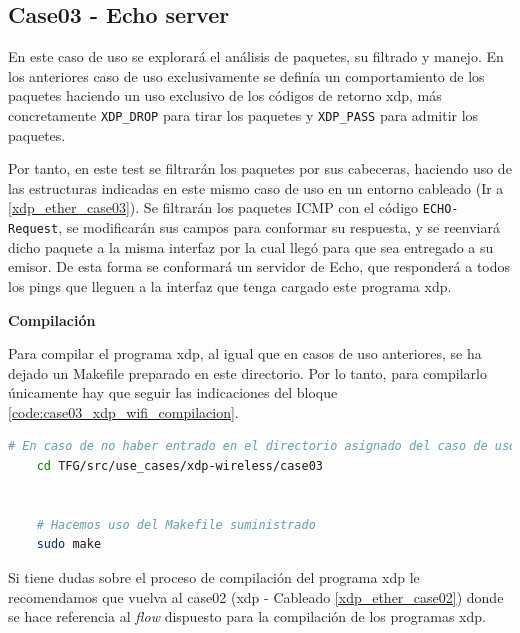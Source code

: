 \subsection{Case03 - Echo server}
\label{xdp_wifi_case03}

En este caso de uso se explorará el análisis de paquetes, su filtrado y manejo. En los anteriores caso de uso exclusivamente se definía un comportamiento de los paquetes haciendo un uso exclusivo de los códigos de retorno \gls{xdp}, más concretamente \texttt{XDP\_DROP} para tirar los paquetes y \texttt{XDP\_PASS} para admitir los paquetes.\\
\par
Por tanto, en este test se filtrarán los paquetes por sus cabeceras, haciendo uso de las estructuras indicadas en este mismo caso de uso en un entorno cableado (Ir a \ref{xdp_ether_case03}). Se filtrarán los paquetes ICMP con el código \texttt{ECHO-Request}, se modificarán sus campos para conformar su respuesta, y se reenviará dicho paquete a la misma interfaz por la cual llegó para que sea entregado a su emisor. De esta forma se conformará un servidor de Echo, que responderá a todos los pings que lleguen a la interfaz que tenga cargado este programa \gls{xdp}. 

\vspace{0.5cm}
\textbf{Compilación}\\
\par

Para compilar el programa \gls{xdp}, al igual que en casos de uso anteriores, se ha dejado un Makefile preparado en este directorio. Por lo tanto, para compilarlo únicamente hay que seguir las indicaciones del bloque \ref{code:case03_xdp_wifi_compilacion}.

\begin{lstlisting}[language= bash, style=Consola, caption={Compilación programa XDP - Case03},label=code:case03_xdp_wifi_compilacion]
    # En caso de no haber entrado en el directorio asignado del caso de uso
    cd TFG/src/use_cases/xdp-wireless/case03
    
    
    # Hacemos uso del Makefile suministrado 
    sudo make
\end{lstlisting}
\vspace{0.5cm}

Si tiene dudas sobre el proceso de compilación del programa \gls{xdp} le recomendamos que vuelva al case02 (\gls{xdp} - Cableado \ref{xdp_ether_case02}) donde se hace referencia al \textit{flow} dispuesto para la compilación de los programas \gls{xdp}.\\
\par



